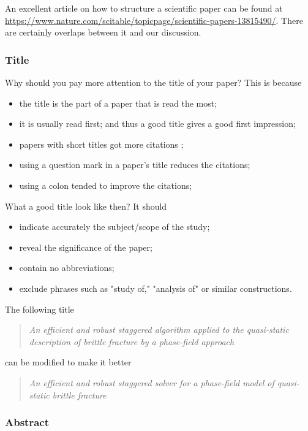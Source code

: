 \documentclass[authoryear,12pta4paper,fleqn]{article}
\numberwithin{equation}{section}
\theoremstyle{remark}
\begin{document}
An excellent article on how to structure a scientific paper can be found at \url{https://www.nature.com/scitable/topicpage/scientific-papers-13815490/}. There are certainly overlaps between it and our discussion. 



\subsubsection{Title}\label{sec:title}

Why should you pay more attention to the title of your paper? This is because
\begin{itemize}
\item the title  is the part of a paper that is read the most;
\item it is usually read first; and thus a good title gives a good first impression;
\item papers with short titles  got more citations \citep{paiva2012articles};
\item using a question mark in a paper’s title reduces the citations;
\item using a colon tended to improve the citations;
\end{itemize}

What a good title look like then? It should

\begin{itemize}
\item indicate accurately the subject/scope of the study;
\item reveal the significance of the paper;
\item contain no abbreviations;
\item exclude phrases such as "study of," "analysis of" or similar constructions.
\end{itemize}

The following title 
\begin{quote}
  \textit{An efficient and robust staggered algorithm applied to the quasi-static description 
  of brittle fracture by a phase-field approach}
 \end{quote}
can be modified to make it better
\begin{quote}
  \textit{An efficient and robust staggered solver for a phase-field model of  quasi-static 
  brittle fracture}
\end{quote}
\subsubsection{Abstract}\label{sec:abstract}
\end{document}
